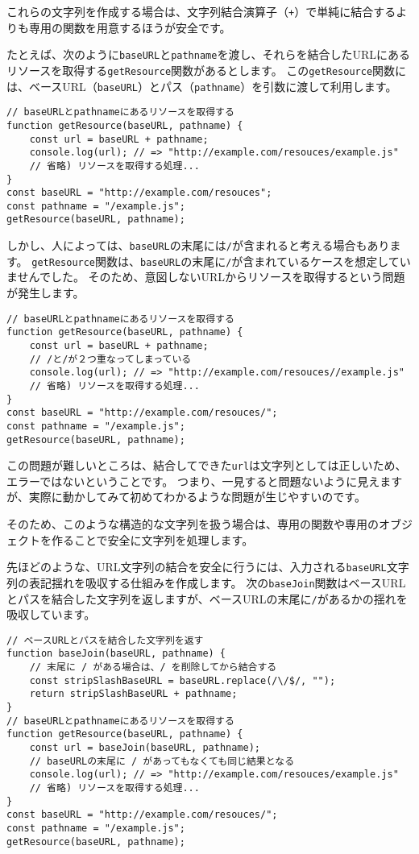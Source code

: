 これらの文字列を作成する場合は、文字列結合演算子（\texttt{+}）で単純に結合するよりも専用の関数を用意するほうが安全です。

たとえば、次のように\texttt{baseURL}と\texttt{pathname}を渡し、それらを結合したURLにあるリソースを取得する\texttt{getResource}関数があるとします。
この\texttt{getResource}関数には、ベースURL（\texttt{baseURL}）とパス（\texttt{pathname}）を引数に渡して利用します。

\begin{lstlisting}
// baseURLとpathnameにあるリソースを取得する
function getResource(baseURL, pathname) {
    const url = baseURL + pathname;
    console.log(url); // => "http://example.com/resouces/example.js"
    // 省略) リソースを取得する処理...
}
const baseURL = "http://example.com/resouces";
const pathname = "/example.js";
getResource(baseURL, pathname);
\end{lstlisting}

しかし、人によっては、\texttt{baseURL}の末尾には\texttt{/}が含まれると考える場合もあります。
\texttt{getResource}関数は、\texttt{baseURL}の末尾に\texttt{/}が含まれているケースを想定していませんでした。
そのため、意図しないURLからリソースを取得するという問題が発生します。

\begin{lstlisting}
// baseURLとpathnameにあるリソースを取得する
function getResource(baseURL, pathname) {
    const url = baseURL + pathname;
    // /と/が２つ重なってしまっている
    console.log(url); // => "http://example.com/resouces//example.js"
    // 省略) リソースを取得する処理...
}
const baseURL = "http://example.com/resouces/";
const pathname = "/example.js";
getResource(baseURL, pathname);
\end{lstlisting}

この問題が難しいところは、結合してできた\texttt{url}は文字列としては正しいため、エラーではないということです。
つまり、一見すると問題ないように見えますが、実際に動かしてみて初めてわかるような問題が生じやすいのです。

そのため、このような構造的な文字列を扱う場合は、専用の関数や専用のオブジェクトを作ることで安全に文字列を処理します。

先ほどのような、URL文字列の結合を安全に行うには、入力される\texttt{baseURL}文字列の表記揺れを吸収する仕組みを作成します。
次の\texttt{baseJoin}関数はベースURLとパスを結合した文字列を返しますが、ベースURLの末尾に\texttt{/}があるかの揺れを吸収しています。

\begin{lstlisting}
// ベースURLとパスを結合した文字列を返す
function baseJoin(baseURL, pathname) {
    // 末尾に / がある場合は、/ を削除してから結合する
    const stripSlashBaseURL = baseURL.replace(/\/$/, "");
    return stripSlashBaseURL + pathname;
}
// baseURLとpathnameにあるリソースを取得する
function getResource(baseURL, pathname) {
    const url = baseJoin(baseURL, pathname);
    // baseURLの末尾に / があってもなくても同じ結果となる
    console.log(url); // => "http://example.com/resouces/example.js"
    // 省略) リソースを取得する処理...
}
const baseURL = "http://example.com/resouces/";
const pathname = "/example.js";
getResource(baseURL, pathname);
\end{lstlisting}

